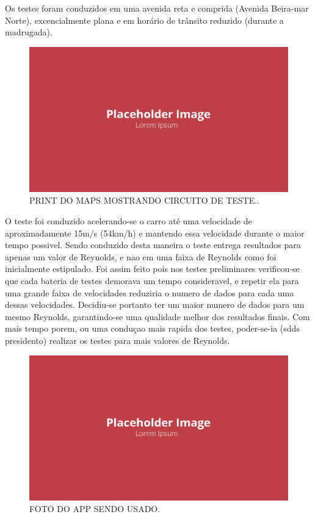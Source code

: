 Os testes foram conduzidos em uma avenida reta e comprida (Avenida Beira-mar Norte), excencialmente plana e em horário de trânsito reduzido (durante a madrugada).

\begin{figure}[!ht]
    \centering
    \includegraphics[width=.8\linewidth]{figuras/placeholder.png}
    \caption{PRINT DO MAPS MOSTRANDO CIRCUITO DE TESTE.\cite{autor}.}
    \label{fig:placeholder}
\end{figure}

O teste foi conduzido acelerando-se o carro até uma velocidade de aproximadamente 15m/s (54km/h) e mantendo essa velocidade durante o maior tempo possivel. Sendo conduzido desta maneira o teste entrega resultados para apenas um valor de Reynolds, e nao em uma faixa de Reynolds como foi inicialmente estipulado. Foi assim feito pois nos testes preliminares verificou-se que cada bateria de testes demorava um tempo consideravel, e repetir ela para uma grande faixa de velocidades reduziria o numero de dados para cada uma dessas velocidades. Decidiu-se portanto ter um maior numero de dados para um mesmo Reynolds, garantindo-se uma qualidade melhor dos resultados finais. Com mais tempo porem, ou uma conduçao mais rapida dos testes, poder-se-ia (sdds presidento) realizar os testes para mais valores de Reynolds.  

\begin{figure}[!ht]
    \centering
    \includegraphics[width=.8\linewidth]{figuras/placeholder.png}
    \caption{FOTO DO APP SENDO USADO\cite{autor}.}
    \label{fig:placeholder}
\end{figure}

